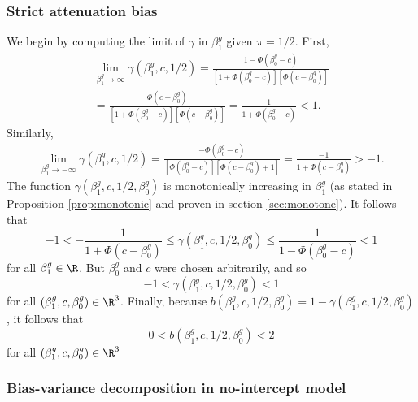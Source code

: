 \documentclass[12pt]{article}
\begin{document}
\subsubsection{Strict attenuation bias}\label{sec:att_bias}

We begin by computing the limit of $\gamma$ in $\beta^g_1$ given $\pi = 1/2$.  First,
\begin{multline*}
\lim_{\beta^g_1 \to \infty} \gamma(\beta^g_1, c, 1/2) = \frac{1 - \Phi(\beta^g_0 - c)}{\left[1 + \Phi(\beta^g_0 - c) \right] \left[\Phi(c - \beta^g_0) \right]} \\ = \frac{\Phi(c - \beta^g_0)}{ \left[1 + \Phi(\beta^g_0 - c) \right] \left[\Phi(c - \beta^g_0) \right]} = \frac{1}{1 + \Phi(\beta^g_0 - c)} < 1.
\end{multline*}
Similarly,
\begin{multline*}
\lim_{\beta^g_1 \to -\infty} \gamma(\beta^g_1, c, 1/2) = \frac{ - \Phi(\beta^g_0 - c)}{\left[\Phi(\beta^g_0 - c)\right] \left[\Phi(c - \beta^g_0) + 1 \right]} = \frac{-1}{1 + \Phi(c - \beta^g_0)} > -1.
\end{multline*}
The function $\gamma(\beta^g_1, c, 1/2, \beta^g_0)$ is monotonically increasing in $\beta^g_1$ (as stated in Proposition \ref{prop:monotonic} and proven in section \ref{sec:monotone}). It follows that 
$$-1 < -\frac{1}{1 + \Phi(c - \beta^g_0)} \leq \gamma(\beta^g_1, c, 1/2, \beta^g_0) \leq \frac{1}{1 - \Phi(\beta^g_0 - c)} < 1$$ for all $\beta^g_1 \in \R$. But $\beta^g_0$ and $c$ were chosen arbitrarily, and so
$$-1 < \gamma(\beta^g_1, c, 1/2, \beta^g_0) < 1$$ for all $(\beta^g_1, c, \beta^g_0) \in \R^3$. Finally, because $b(\beta^g_1, c, 1/2, \beta^g_0) = 1 - \gamma(\beta^g_1, c, 1/2, \beta^g_0)$, it follows that
$$ 0 < b(\beta^g_1, c, 1/2, \beta^g_0) < 2$$ for all $(\beta^g_1, c, \beta^g_0) \in \R^3$

\subsubsection{Bias-variance decomposition in no-intercept model}\label{sec:bv_decomp}
 
\end{document}
